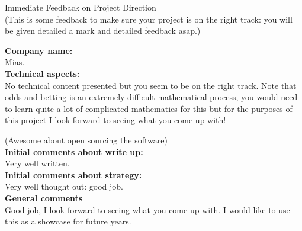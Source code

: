 \documentclass{article}
\begin{document}
\begin{center}
\Huge{Immediate Feedback on Project Direction}\\
\tiny{(This is some feedback to make sure your project is on the right track: you will be given detailed a mark and detailed feedback asap.)}
\end{center}


\normalsize
\textbf{Company name:}\\

Mias. \\

\textbf{Technical aspects:}\\

No technical content presented but you seem to be on the right track.
Note that odds and betting is an extremely difficult mathematical process, you would need to learn quite a lot of complicated mathematics for this but for the purposes of this project I look forward to seeing what you come up with!

(Awesome about open sourcing the software)\\

\textbf{Initial comments about write up:}\\

Very well written.\\

\textbf{Initial comments about strategy:}\\

Very well thought out: good job.\\

\textbf{General comments}\\

Good job, I look forward to seeing what you come up with. I would like to use this as a showcase for future years.\\
\end{document}

